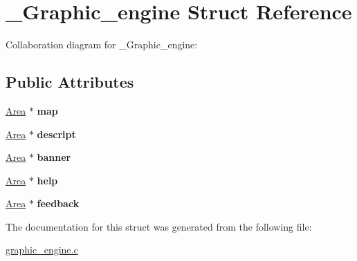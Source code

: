 \hypertarget{struct__Graphic__engine}{}\section{\+\_\+\+Graphic\+\_\+engine Struct Reference}
\label{struct__Graphic__engine}


Collaboration diagram for \+\_\+\+Graphic\+\_\+engine\+:
\subsection*{Public Attributes}
\begin{DoxyCompactItemize}
\item 
\mbox{\label{struct__Graphic__engine_a1ea06bb881d335da8c31d63b3e834bdb}} 
\hyperlink{struct__Area}{Area} $\ast$ {\bfseries map}
\item 
\mbox{\label{struct__Graphic__engine_a8a4927aedd398b43f86c871f197edf1d}} 
\hyperlink{struct__Area}{Area} $\ast$ {\bfseries descript}
\item 
\mbox{\label{struct__Graphic__engine_a37d117af941b6aa825bb3dff24fe9e27}} 
\hyperlink{struct__Area}{Area} $\ast$ {\bfseries banner}
\item 
\mbox{\label{struct__Graphic__engine_a96833ee68d6330b61014979614f7fb77}} 
\hyperlink{struct__Area}{Area} $\ast$ {\bfseries help}
\item 
\mbox{\label{struct__Graphic__engine_aaae226ce3b87e512ec196f792ed2f552}} 
\hyperlink{struct__Area}{Area} $\ast$ {\bfseries feedback}
\end{DoxyCompactItemize}


The documentation for this struct was generated from the following file\+:\begin{DoxyCompactItemize}
\item 
\hyperlink{graphic__engine_8c}{graphic\+\_\+engine.\+c}\end{DoxyCompactItemize}
